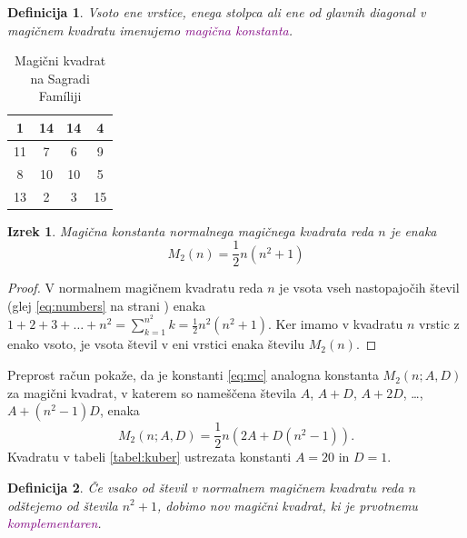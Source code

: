 \documentclass[a4paper,12pt]{article}
\newtheorem{definition}{Definicija}
\newtheorem{plain}{Izrek}
\begin{document}
   \begin{definition}
         Vsoto ene vrstice, enega stolpca ali ene od glavnih diagonal
         v magičnem kvadratu imenujemo \textcolor{purple}{magična konstanta}.
   \end{definition}

   \newpage

   \begin{table}[h!]
      \centering
      \caption{Magični kvadrat na Sagradi Famíliji}
      \label{table:sagrada}
      \begin{tabular}{|c|c|c|c|}
      \hline
         1 & 14 & 14 &  4 \\\hline
         11 &  7 &  6 &  9 \\\hline
         8 & 10 & 10 &  5 \\\hline
         13 &  2 &  3 & 15 \\\hline
      \end{tabular}
   \end{table}

   \begin{plain}
      Magična konstanta normalnega magičnega kvadrata reda $n$
      je enaka
      \begin{equation}
        \label{eq:mc}
          M_2(n) = \frac{1}{2} n(n^2 + 1) 
      \end{equation}
   \end{plain}

\begin{proof}
   V normalnem magičnem kvadratu reda $n$ je vsota vseh nastopajočih
   števil (glej \eqref{eq:numbers} na strani \pageref{eq:numbers}) enaka
   $1+2+3+\dots+n^2=\sum_{k=1}^{n^2}k=\frac{1}{2}n^2(n^2+1)$. Ker imamo
   v kvadratu $n$ vrstic z enako vsoto, je vsota števil v eni vrstici
   enaka številu $M_2(n)$. %
\end{proof}

Preprost račun pokaže, da je konstanti \eqref{eq:mc} analogna konstanta
$M_2(n;A,D)$ za magični kvadrat, v katerem so nameščena števila
$A$, $A+D$, $A+2D$, \dots, $A+(n^2-1)D$, enaka 
\begin{equation}
    M_2(n;A,D)= \frac{1}{2} n(2A + D(n^2 - 1)).
\end{equation}
Kvadratu v tabeli \ref{tabel:kuber} ustrezata konstanti $A=20$ in $D=1$.

\begin{definition}
      Če vsako od števil v normalnem magičnem kvadratu reda $n$ odštejemo
      od števila $n^2+1$, dobimo nov magični kvadrat, ki je prvotnemu
      \textcolor{purple}{komplementaren}.
\end{definition}
\end{document}
